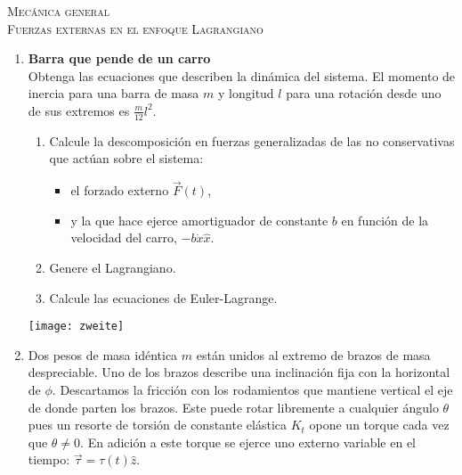 \documentclass[11pt,spanish,a4paper]{article}
\begin{document}
\begin{center}
  \textsc{\large Mecánica general}\\
  \textsc{\large Fuerzas externas en el enfoque Lagrangiano}
\end{center}

\begin{enumerate}

\item 
\begin{minipage}[t][6.5cm]{0.55\textwidth}
\textbf{Barra que pende de un carro}\\
Obtenga las ecuaciones que describen la dinámica del sistema.
El momento de inercia para una barra de masa \(m\) y longitud \(l\) para una rotación desde uno de sus extremos es \(\frac{m}{12} l^2\). 
\begin{enumerate}
	\item Calcule la descomposición en fuerzas generalizadas de las no conservativas que actúan sobre el sistema:
	\begin{itemize}
		\item el forzado externo \(\vec{F}(t)\),
		\item y la que hace ejerce amortiguador de constante \(b\) en función de la velocidad del carro,  \(- b \dot{x} \hat{x}\).
	\end{itemize}
	\item Genere el Lagrangiano.
	\item Calcule las ecuaciones de Euler-Lagrange. 
\end{enumerate}
\end{minipage}
\begin{minipage}[c][0cm][t]{0.4\textwidth}
	\texttt{[image: zweite]}
\end{minipage}




\item 
\begin{minipage}[t][6cm]{0.6\textwidth}
Dos pesos de masa idéntica $m$ están unidos al extremo de brazos de masa despreciable.
Uno de los brazos describe una inclinación fija con la horizontal de $\phi$.
Descartamos la fricción con los rodamientos que mantiene vertical el eje de donde parten los brazos.
Este puede rotar libremente a cualquier ángulo $\theta$ pues un resorte de torsión de constante elástica $K_t$ opone un torque cada vez que $\theta \neq 0$.
En adición a este torque se ejerce uno externo variable en el tiempo: $\vec{\tau}= \tau (t) \hat{z}$.


\end{minipage}
\end{enumerate}
\end{document}
